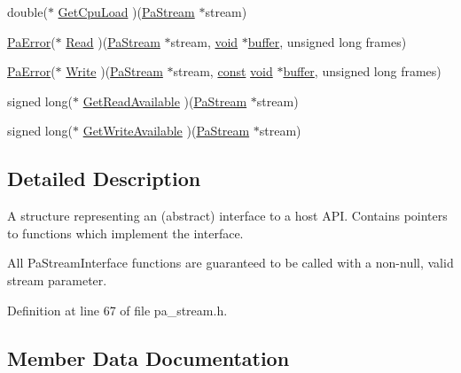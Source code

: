 \begin{DoxyCompactItemize}
\item 
double($\ast$ \hyperlink{struct_pa_util_stream_interface_aee1f57e1493d87c6bb2262450ae3f9f6}{Get\+Cpu\+Load} )(\hyperlink{portaudio_8h_a19874734f89958fccf86785490d53b4c}{Pa\+Stream} $\ast$stream)
\item 
\hyperlink{portaudio_8h_a4949e4a8ef9f9dbe8cbee414ce69841d}{Pa\+Error}($\ast$ \hyperlink{struct_pa_util_stream_interface_a01efcb469d7599b6c01e022d818d733a}{Read} )(\hyperlink{portaudio_8h_a19874734f89958fccf86785490d53b4c}{Pa\+Stream} $\ast$stream, \hyperlink{sound_8c_ae35f5844602719cf66324f4de2a658b3}{void} $\ast$\hyperlink{structbuffer}{buffer}, unsigned long frames)
\item 
\hyperlink{portaudio_8h_a4949e4a8ef9f9dbe8cbee414ce69841d}{Pa\+Error}($\ast$ \hyperlink{struct_pa_util_stream_interface_a71eca20886fabf7c0d0de557ba485428}{Write} )(\hyperlink{portaudio_8h_a19874734f89958fccf86785490d53b4c}{Pa\+Stream} $\ast$stream, \hyperlink{getopt1_8c_a2c212835823e3c54a8ab6d95c652660e}{const} \hyperlink{sound_8c_ae35f5844602719cf66324f4de2a658b3}{void} $\ast$\hyperlink{structbuffer}{buffer}, unsigned long frames)
\item 
signed long($\ast$ \hyperlink{struct_pa_util_stream_interface_aae845782dcdc0466ebef7bd6f213a847}{Get\+Read\+Available} )(\hyperlink{portaudio_8h_a19874734f89958fccf86785490d53b4c}{Pa\+Stream} $\ast$stream)
\item 
signed long($\ast$ \hyperlink{struct_pa_util_stream_interface_ac448b65951cd4a62c0dd24d2f71f4c6e}{Get\+Write\+Available} )(\hyperlink{portaudio_8h_a19874734f89958fccf86785490d53b4c}{Pa\+Stream} $\ast$stream)
\end{DoxyCompactItemize}


\subsection{Detailed Description}
A structure representing an (abstract) interface to a host A\+PI. Contains pointers to functions which implement the interface.

All Pa\+Stream\+Interface functions are guaranteed to be called with a non-\/null, valid stream parameter. 

Definition at line 67 of file pa\+\_\+stream.\+h.



\subsection{Member Data Documentation}
